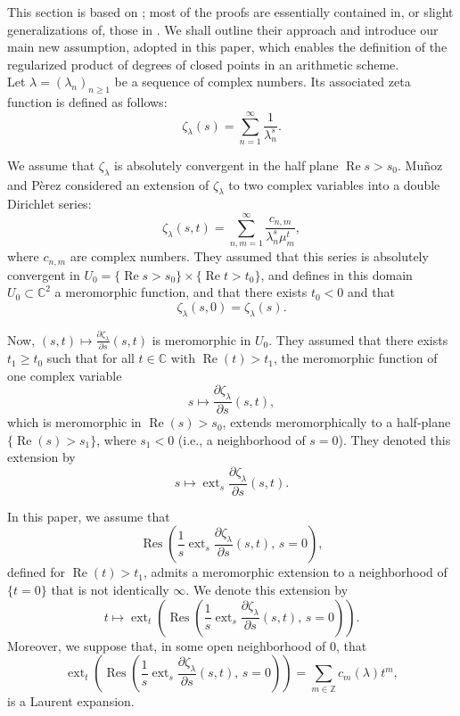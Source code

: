 \documentclass[12pt]{amsart}
\begin{document}
This section is based on \cite{Marco_prime}; most of the proofs are essentially contained in, or slight generalizations of, those in \cite[\S~2]{Marco_prime}. We shall outline their approach and introduce our main new assumption, adopted in this paper, which enables the definition of the regularized product of degrees of closed points in an  {arithmetic}  scheme.\\


Let  $\lambda = (\lambda_n)_{n \geq 1}$ be a sequence  of complex numbers.  Its associated zeta function is defined as follows:
\[
\zeta_\lambda(s) = \sum_{n=1}^{\infty} \frac{1}{\lambda_n^{s}}.
\]


We assume that $\zeta_\lambda$ is absolutely convergent in the half plane $\operatorname{Re} s > s_0$. 
Mu\~noz and P\`erez considered an extension of $\zeta_\lambda$ to two complex variables into a double Dirichlet series:
\[
\zeta_\lambda(s,t) = \sum_{n,m=1}^{\infty}  \frac{c_{n,m}}{\lambda_n^{s} \mu_m^{t}},
\]
where $c_{n,m}$ are complex numbers.
They assumed that this series is absolutely convergent in $U_0 = \{ \operatorname{Re} s > s_0 \} \times \{ \operatorname{Re} t > t_0 \}$, and defines in this domain $U_0 \subset \mathbb{C}^2$ a meromorphic function, and that there exists $t_0 < 0$ and that
\[
\zeta_\lambda(s,0) = \zeta_\lambda(s).
\]





Now, $(s,t) \mapsto \frac{\partial \zeta_\lambda}{\partial s}(s,t)$ is meromorphic in $U_0$. 
They assumed that there exists $t_1 \geq t_0$ such that for all $t \in \mathbb{C}$ with $\operatorname{Re}(t) > t_1$, 
the meromorphic function of one complex variable 
\[
s \mapsto \frac{\partial \zeta_\lambda}{\partial s}(s,t),
\]
which is meromorphic in $\operatorname{Re}(s) > s_0$, extends meromorphically to a half-plane $\{ \operatorname{Re}(s) > s_1 \}$, where $s_1 < 0$ (i.e., a neighborhood of $s = 0$). 
They denoted this extension by
\[
s \mapsto \operatorname{ext}_s \frac{\partial \zeta_\lambda}{\partial s}(s,t).
\]


In this paper, we assume that
\[
\operatorname{Res}\left( \frac{1}{s} \operatorname{ext}_s \frac{\partial \zeta_\lambda}{\partial s}(s,t),\, s=0 \right),
\]
defined for $\operatorname{Re}(t) > t_1$, admits a meromorphic extension to a neighborhood of $\{ t = 0 \}$ that is not identically $\infty$. We denote this extension by
\[
t \mapsto \operatorname{ext}_t \left( \operatorname{Res}\left( \frac{1}{s} \operatorname{ext}_s \frac{\partial \zeta_\lambda}{\partial s}(s,t),\, s=0 \right) \right).
\]
Moreover, we suppose that, in some open neighborhood of $0$, that
\begin{equation}\label{assumption1}
\operatorname{ext}_t \left( \operatorname{Res}\left( \frac{1}{s} \operatorname{ext}_s \frac{\partial \zeta_\lambda}{\partial s}(s,t),\, s=0 \right) \right)
= \sum_{m \in \mathbb{Z}} c_m(\lambda) t^m,
\end{equation}
is a Laurent expansion.
\end{document}

